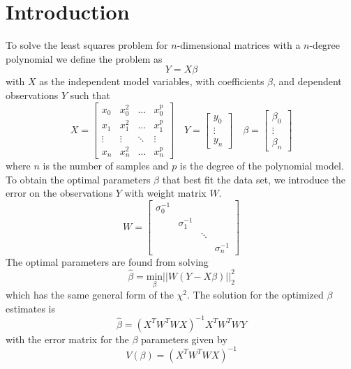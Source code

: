 \documentclass[10pt,a4paper]{article}
\begin{document}
 
\pagestyle{fancy}
\fancyhf{}
\section{Introduction}
To solve the least squares problem for $n$-dimensional matrices with a $n$-degree polynomial we define the problem as
\begin{equation}
Y = X\beta
\end{equation}
with $X$ as the independent model variables, with coefficients $\beta$, and dependent observations $Y$ such that
\begin{equation}
X=
\begin{bmatrix}
    x_{0} & x_{0}^{2} & \dots  & x_{0}^{p} \\
    x_{1} & x_{1}^{2}  & \dots  & x_{1}^{p} \\
    \vdots & \vdots  & \ddots & \vdots \\
    x_{n} & x_{n}^{2} & \dots  & x_{n}^{p}
\end{bmatrix}
\quad Y=
\begin{bmatrix}
	y_{0} \\
	\vdots \\
	y_{n} 
\end{bmatrix}
\quad \beta=
\begin{bmatrix}
	\beta_{0} \\
	\vdots \\
	\beta_{n}
\end{bmatrix}
\end{equation}
where $n$ is the number of samples and $p$ is the degree of the polynomial model. To obtain the optimal parameters $\beta$ that best fit the data set, we introduce the error on the observations $Y$ with weight matrix $W$.
\begin{equation}
W = 
\begin{bmatrix}
\sigma_{0}^{-1} & & & \\
 & \sigma_{1}^{-1} & & \\
 & & \ddots & \\
 & & & \sigma_{n}^{-1}
\end{bmatrix}
\end{equation}
The optimal parameters are found from solving
\begin{equation}
\hat{\beta} = \underset{\beta}{\text{min}} || W(Y-X\beta)||_{2}^{2}
\end{equation}
which has the same general form of the $\chi^{2}$. The solution for the optimized $\beta$ estimates is 
\begin{equation}
\hat{\beta} = (X^{T}W^{T}WX)^{-1}X^{T}W^{T}WY
\end{equation}
with the error matrix for the $\beta$ parameters given by
\begin{equation}
V(\beta) = (X^{T}W^{T}WX)^{-1}
\end{equation}
\end{document}
